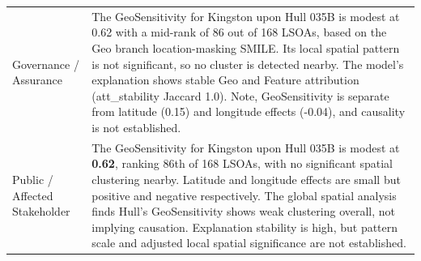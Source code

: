 \begin{table}[H]
\begin{tabularx}{\textwidth}{p{} X}
Governance / Assurance &
The GeoSensitivity for Kingston upon Hull 035B is modest at 0.62 with a mid-rank of 86 out of 168 LSOAs, based on the Geo branch location-masking SMILE. Its local spatial pattern is not significant, so no cluster is detected nearby. The model’s explanation shows stable Geo and Feature attribution (att\_stability Jaccard 1.0). Note, GeoSensitivity is separate from latitude (0.15) and longitude effects (-0.04), and causality is not established. \\
Public / Affected Stakeholder &
The GeoSensitivity for Kingston upon Hull 035B is modest at \textbf{0.62}, ranking 86th of 168 LSOAs, with no significant spatial clustering nearby. Latitude and longitude effects are small but positive and negative respectively. The global spatial analysis finds Hull’s GeoSensitivity shows weak clustering overall, not implying causation. Explanation stability is high, but pattern scale and adjusted local spatial significance are not established. \\
\bottomrule
\end{tabularx}
\end{table}
